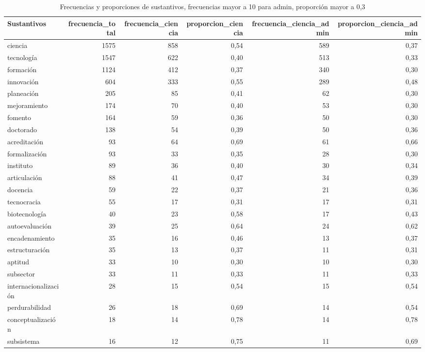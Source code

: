 \documentclass[11pt,                                                            
 superscriptaddress,twoside,
 amsmath,amssymb,
 aps, physrev
]{revtex4-2}
\begin{document}
\begin{table}[ht]
	\centering
	\begin{tabular}{lrrrrr}
		\hline
		Sustantivos & frecuencia\_total & frecuencia\_ciencia & proporcion\_ciencia & frecuencia\_ciencia\_admin & proporcion\_ciencia\_admin \\
		\hline
		ciencia                & 1575 & 858 & 0,54 & 589 & 0,37 \\
		tecnología             & 1547 & 622 & 0,40 & 513 & 0,33 \\
		formación              & 1124 & 412 & 0,37 & 340 & 0,30 \\
		innovación             & 604  & 333 & 0,55 & 289 & 0,48 \\
		planeación             & 205  & 85  & 0,41 & 62  & 0,30 \\
		mejoramiento           & 174  & 70  & 0,40 & 53  & 0,30 \\
		fomento                & 164  & 59  & 0,36 & 50  & 0,30 \\
		doctorado              & 138  & 54  & 0,39 & 50  & 0,36 \\
		acreditación           & 93   & 64  & 0,69 & 61  & 0,66 \\
		formalización          & 93   & 33  & 0,35 & 28  & 0,30 \\
		instituto              & 89   & 36  & 0,40 & 30  & 0,34 \\
		articulación           & 88   & 41  & 0,47 & 34  & 0,39 \\
		docencia               & 59   & 22  & 0,37 & 21  & 0,36 \\
		tecnocracia            & 55   & 17  & 0,31 & 17  & 0,31 \\
		biotecnología          & 40   & 23  & 0,58 & 17  & 0,43 \\
		autoevaluación         & 39   & 25  & 0,64 & 24  & 0,62 \\
		encadenamiento         & 35   & 16  & 0,46 & 13  & 0,37 \\
		estructuración         & 35   & 13  & 0,37 & 11  & 0,31 \\
		aptitud                & 33   & 10  & 0,30 & 10  & 0,30 \\
		subsector              & 33   & 11  & 0,33 & 11  & 0,33 \\
		internacionalización   & 28   & 15  & 0,54 & 15  & 0,54 \\
		perdurabilidad         & 26   & 18  & 0,69 & 14  & 0,54 \\
		conceptualización      & 18   & 14  & 0,78 & 14  & 0,78 \\
		subsistema             & 16   & 12  & 0,75 & 11  & 0,69 \\
		\hline
	\end{tabular}
	\caption{Frecuencias y proporciones de sustantivos, frecuencias mayor a 10 para admin, proporción mayor a 0,3}
\end{table}
\end{document}
